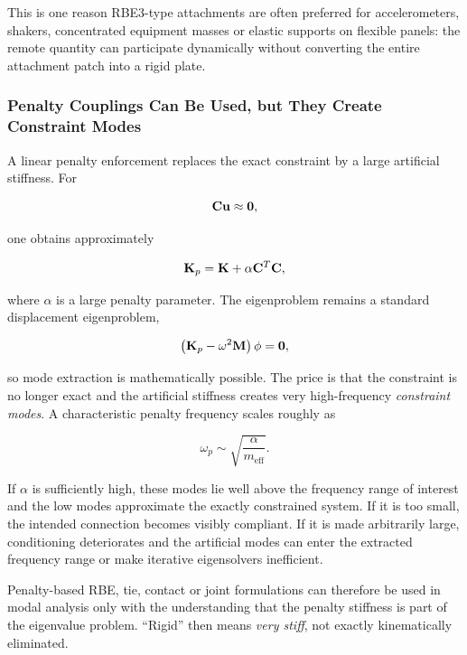 This is one reason RBE3-type attachments are often preferred for accelerometers,
shakers, concentrated equipment masses or elastic supports on flexible panels:
the remote quantity can participate dynamically without converting the entire
attachment patch into a rigid plate.

\subsubsection{Penalty Couplings Can Be Used, but They Create Constraint Modes}

A linear penalty enforcement replaces the exact constraint by a large artificial
stiffness. For

\begin{equation}
    \mathbf{C}\mathbf{u}\approx\mathbf{0},
\end{equation}

one obtains approximately

\begin{equation}\label{coupling-modal-penalty-stiffness}
    \mathbf{K}_{p}
    =\mathbf{K}+\alpha\mathbf{C}^{T}\mathbf{C},
\end{equation}

where $\alpha$ is a large penalty parameter. The eigenproblem remains a standard
displacement eigenproblem,

\begin{equation}
    \left(\mathbf{K}_{p}-\omega^2\mathbf{M}\right)\mathbf{\phi}=\mathbf{0},
\end{equation}

so mode extraction is mathematically possible. The price is that the constraint
is no longer exact and the artificial stiffness creates very high-frequency
\emph{constraint modes}. A characteristic penalty frequency scales roughly as

\begin{equation}
    \omega_p\sim\sqrt{\frac{\alpha}{m_{\mathrm{eff}}}}.
\end{equation}

If $\alpha$ is sufficiently high, these modes lie well above the frequency range
of interest and the low modes approximate the exactly constrained system. If it
is too small, the intended connection becomes visibly compliant. If it is made
arbitrarily large, conditioning deteriorates and the artificial modes can enter
the extracted frequency range or make iterative eigensolvers inefficient.

Penalty-based RBE, tie, contact or joint formulations can therefore be used in
modal analysis only with the understanding that the penalty stiffness is part of
the eigenvalue problem. ``Rigid'' then means \emph{very stiff}, not exactly
kinematically eliminated.

